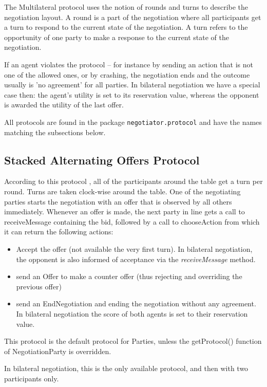 \documentclass[]{article}
\begin{document}
 The Multilateral protocol uses the notion of rounds and turns to describe the negotiation layout. A round is a part of the negotiation where all participants get a turn to respond to the current state of the negotiation. A turn refers to the opportunity of one party to make a response to the current state of the negotiation. 
  
If an agent violates the protocol -- for instance by sending an action that is not one of the allowed ones, or by crashing, the negotiation ends and the outcome usually is 'no agreement' for all parties.  In bilateral negotiation we have a special case then: the agent's utility is set to its reservation value, whereas the opponent is awarded the utility of the last offer.

All protocols are found in the package \verb|negotiator.protocol| and have the names matching the subsections below.


\subsection{Stacked Alternating Offers Protocol}
According to this protocol \cite{MultilateralOffersProtocols} , all of the participants around the table get a turn per round. Turns are taken clock-wise around the table. One of the negotiating parties starts the negotiation with an offer that is observed by all others immediately. Whenever an offer is made, the next party in line gets a call to receiveMessage containing the bid, followed by a call to chooseAction from which it can return the following actions:
\begin{itemize}
\item Accept the offer (not available the very first turn). In bilateral negotiation, the opponent is also informed of acceptance via the \textit{receiveMessage} method.
\item send an Offer to make a counter offer (thus rejecting and overriding the previous offer) 
\item send an EndNegotiation and ending the negotiation without any agreement. In bilateral negotiation the score of both agents is set to their reservation value.
\end{itemize}

This protocol is the default protocol for Parties, unless  the getProtocol() function of NegotiationParty is overridden. 

In bilateral negotiation, this is the only available protocol, and then with two participants only. 
\end{document}

